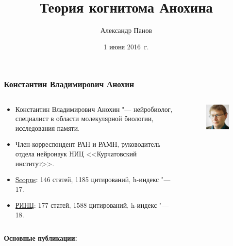 \documentclass[default]{beamer}
\begin{document}
	
	\title[Cognitome]{Теория когнитома Анохина}
	\author[Панов]{Александр Панов}
	\date{1 июня 2016~г.} 
	
	\begin{frame}
		\titlepage
	\end{frame}
		
	\begin{frame}
		\frametitle{Константин Владимирович Анохин}
		
		\footnotesize
		\begin{columns}
			\begin{column}{0.8\textwidth}
				\begin{itemize}
					\item Константин Владимирович Анохин "--- нейробиолог, специалист в области молекулярной биологии, исследования памяти.
					\item Член-корреспондент РАН и РАМН, руководитель отдела нейронаук НИЦ <<Курчатовский институт>>.
					\item \href{https://www.scopus.com/authid/detail.uri?authorId=7004196582}{Scopus}: 146 статей, 1185 цитирований, h-индекс "--- 17.
					\item \href{http://elibrary.ru/author_items.asp?authorid=692}{РИНЦ}: 177 статей, 1588 цитирований, h-индекс "--- 18.
				\end{itemize}
			\end{column}
			\begin{column}{0.2\textwidth}
				\begin{figure}
					\includegraphics[width=\textwidth]{anokhin}
				\end{figure}
			\end{column}
		\end{columns}
		\par\medskip
		\textbf{Основные публикации:}
		\nocite{*}
		\printbibliography
	\end{frame}
	
\end{document}
